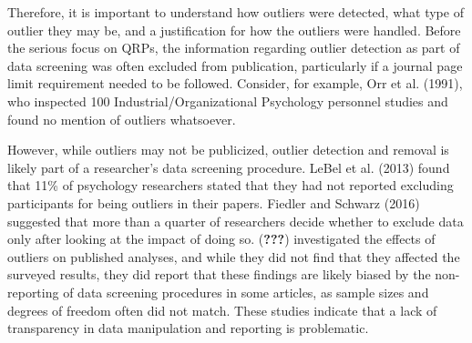 \documentclass[english,,man,mask]{apa6}
\theoremstyle{definition}
\theoremstyle{definition}
\theoremstyle{definition}
\theoremstyle{remark}
\begin{document}
Therefore, it is important to understand how outliers were detected,
what type of outlier they may be, and a justification for how the
outliers were handled. Before the serious focus on QRPs, the information
regarding outlier detection as part of data screening was often excluded
from publication, particularly if a journal page limit requirement
needed to be followed. Consider, for example, Orr et al. (1991), who
inspected 100 Industrial/Organizational Psychology personnel studies and
found no mention of outliers whatsoever.

However, while outliers may not be publicized, outlier detection and
removal is likely part of a researcher's data screening procedure. LeBel
et al. (2013) found that 11\% of psychology researchers stated that they
had not reported excluding participants for being outliers in their
papers. Fiedler and Schwarz (2016) suggested that more than a quarter of
researchers decide whether to exclude data only after looking at the
impact of doing so. ({\textbf{???}}) investigated the effects of
outliers on published analyses, and while they did not find that they
affected the surveyed results, they did report that these findings are
likely biased by the non-reporting of data screening procedures in some
articles, as sample sizes and degrees of freedom often did not match.
These studies indicate that a lack of transparency in data manipulation
and reporting is problematic.
\end{document}
